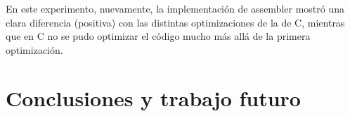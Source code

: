 \documentclass[a4paper]{article}
\begin{document}
En este experimento, nuevamente, la implementaci\'{o}n de assembler mostr\'{o} una clara diferencia (positiva) con las distintas optimizaciones de la de C, mientras que en C no se pudo optimizar el c\'{o}digo mucho m\'{a}s all\'{a} de la primera optimizaci\'{o}n.

\newpage

%

\section{Conclusiones y trabajo futuro}
\end{document}
